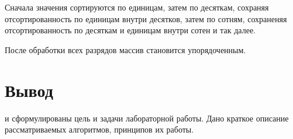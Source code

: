 Сначала значения сортируются по единицам, затем по десяткам, сохраняя отсортированность по единицам внутри десятков, затем по сотням, сохраненяя отсортированность по десяткам и единицам внутри сотен и так далее.

После обработки всех разрядов массив становится упорядоченным.  

\section*{Вывод}
 и сформулированы цель и задачи лабораторной работы. Дано краткое описание рассматриваемых алгоритмов, принципов их работы.